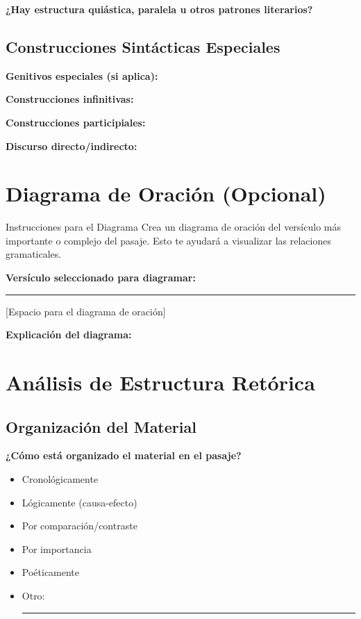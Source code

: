 \documentclass[11pt,a4paper]{article}
\begin{document}
\textbf{¿Hay estructura quiástica, paralela u otros patrones literarios?}
\vspace{2cm}

\subsection{Construcciones Sintácticas Especiales}

\textbf{Genitivos especiales (si aplica):}
\vspace{1.5cm}

\textbf{Construcciones infinitivas:}
\vspace{1.5cm}

\textbf{Construcciones participiales:}
\vspace{1.5cm}

\textbf{Discurso directo/indirecto:}
\vspace{1.5cm}

\newpage

\section{Diagrama de Oración (Opcional)}

\begin{infobox}{Instrucciones para el Diagrama}
Crea un diagrama de oración del versículo más importante o complejo del pasaje. Esto te ayudará a visualizar las relaciones gramaticales.
\end{infobox}

\textbf{Versículo seleccionado para diagramar:} \rule{8cm}{0.4pt}

\vspace{6cm}
\begin{center}
[Espacio para el diagrama de oración]
\end{center}
\vspace{4cm}

\textbf{Explicación del diagrama:}
\vspace{3cm}

\section{Análisis de Estructura Retórica}

\subsection{Organización del Material}

\textbf{¿Cómo está organizado el material en el pasaje?}
\begin{itemize}[leftmargin=1cm]
    \item[$\square$] Cronológicamente
    \item[$\square$] Lógicamente (causa-efecto)
    \item[$\square$] Por comparación/contraste
    \item[$\square$] Por importancia
    \item[$\square$] Poéticamente
    \item[$\square$] Otro: \rule{6cm}{0.4pt}
\end{itemize}
\end{document}
